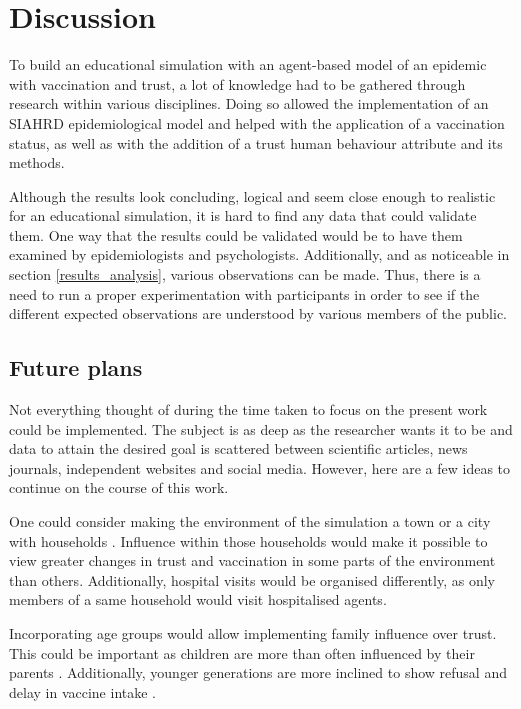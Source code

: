 \chapter{Discussion}

To build an educational simulation with an agent-based model of an epidemic with vaccination and trust, a lot of knowledge had to be gathered through research within various disciplines. Doing so allowed the implementation of an SIAHRD epidemiological model and helped with the application of a vaccination status, as well as with the addition of a trust human behaviour attribute and its methods.

Although the results look concluding, logical and seem close enough to realistic for an educational simulation, it is hard to find any data that could validate them. One way that the results could be validated would be to have them examined by epidemiologists and psychologists.
Additionally, and as noticeable in section \ref{results_analysis}, various observations can be made. Thus, there is a need to run a proper experimentation with participants in order to see if the different expected observations are understood by various members of the public.



\section{Future plans}

Not everything thought of during the time taken to focus on the present work could be implemented. The subject is as deep as the researcher wants it to be and data to attain the desired goal is scattered between scientific articles, news journals, independent websites and social media. However, here are a few ideas to continue on the course of this work.

One could consider making the environment of the simulation a town or a city with households \cite{grignard_gama_2013}. Influence within those households would make it possible to view greater changes in trust and vaccination in some parts of the environment than others.
Additionally, hospital visits would be organised differently, as only members of a same household would visit hospitalised agents.

Incorporating age groups would allow implementing family influence over trust. This could be important as children are more than often influenced by their parents \cite{sheehan_trust_2020}. Additionally, younger generations are more inclined to show refusal and delay in vaccine intake \cite{soares_factors_2021}.

